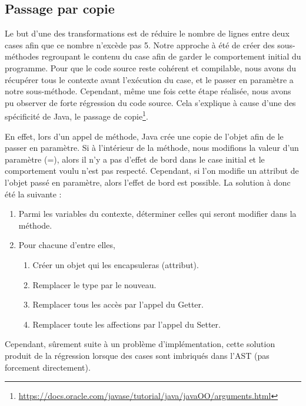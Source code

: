 \documentclass[a4paper]{article}
\begin{document}
\subsection{Passage par copie}
\par Le but d'une des transformations est de réduire le nombre de lignes entre deux cases afin que ce nombre n'excède pas 5. Notre approche à été de créer des sous-méthodes regroupant le contenu du case afin de garder le comportement initial du programme. Pour que le code source reste cohérent et compilable, nous avons du récupérer tous le contexte avant l'exécution du case, et le passer en paramètre a notre sous-méthode. Cependant, même une fois cette étape réalisée, nous avons pu observer de forte régression du code source. Cela s'explique à cause d'une des spécificité de Java, le passage de copie\footnote{\url{https://docs.oracle.com/javase/tutorial/java/javaOO/arguments.html}}.
\\
\par 
En effet, lors d'un appel de méthode, Java crée une copie de l'objet afin de le passer en paramètre. Si à l'intérieur de la méthode, nous modifions la valeur d'un paramètre (=), alors il n'y a pas d'effet de bord dans le case initial et le comportement voulu n'est pas respecté. Cependant, si l'on modifie un attribut de l'objet passé en paramètre, alors l'effet de bord est possible. La solution à donc été la suivante :

\begin{enumerate}
	\item Parmi les variables du contexte, déterminer celles qui seront modifier dans la méthode.
	\item Pour chacune d'entre elles, 
	\begin{enumerate}
	\item Créer un objet qui les encapsuleras (attribut).
	\item Remplacer le type par le nouveau.
	\item Remplacer tous les accès par l'appel du Getter.
	\item Remplacer toute les affections par l'appel du Setter.
	\end{enumerate}
	
\end{enumerate}	

\par
Cependant, sûrement suite à un problème d'implémentation, cette solution produit de la régression lorsque des cases sont imbriqués dans l'AST (pas forcement directement).
\end{document}
